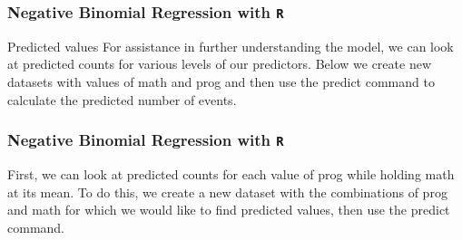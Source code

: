 \documentclass[00-GLMregslides.tex]{subfiles}
\begin{document}
\begin{frame}[fragile]
	\frametitle{Negative Binomial Regression with \texttt{R} }
	\Large
	
	Predicted values
	For assistance in further understanding the model, we can look at predicted counts for various levels of our predictors. Below we create new datasets with values of math and prog and then use the predict command to calculate the predicted number of events.
\end{frame}
\begin{frame}[fragile]
	\frametitle{Negative Binomial Regression with \texttt{R} }
	\Large
	
	First, we can look at predicted counts for each value of prog while holding math at its mean. To do this, we create a new dataset with the combinations of prog and math for which we would like to find predicted values, then use the predict command.
\end{frame}
\end{document}
